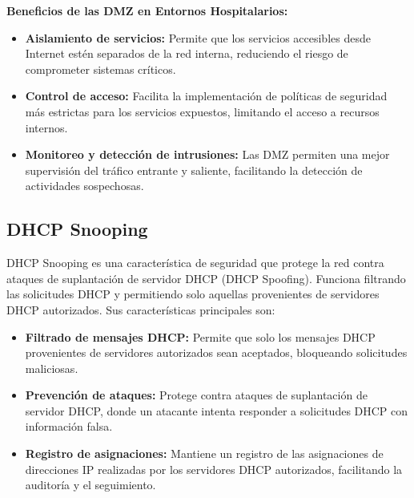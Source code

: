 \textbf{Beneficios de las DMZ en Entornos Hospitalarios:}
\begin{itemize}
    \item \textbf{Aislamiento de servicios:} Permite que los servicios accesibles desde Internet estén separados de la red interna, reduciendo el riesgo de comprometer sistemas críticos.
    \item \textbf{Control de acceso:} Facilita la implementación de políticas de seguridad más estrictas para los servicios expuestos, limitando el acceso a recursos internos.
    \item \textbf{Monitoreo y detección de intrusiones:} Las DMZ permiten una mejor supervisión del tráfico entrante y saliente, facilitando la detección de actividades sospechosas.
\end{itemize}

\subsection{DHCP Snooping}
\label{subsec:dhcpsnooping}
DHCP Snooping es una característica de seguridad que protege la red contra ataques de suplantación de servidor DHCP (DHCP Spoofing). Funciona filtrando las solicitudes DHCP y
permitiendo solo aquellas provenientes de servidores DHCP autorizados. Sus características principales son:
\begin{itemize}
    \item \textbf{Filtrado de mensajes DHCP:} Permite que solo los mensajes DHCP provenientes de servidores autorizados sean aceptados, bloqueando solicitudes maliciosas.
    \item \textbf{Prevención de ataques:} Protege contra ataques de suplantación de servidor DHCP, donde un atacante intenta responder a solicitudes DHCP con información falsa.
    \item \textbf{Registro de asignaciones:} Mantiene un registro de las asignaciones de direcciones IP realizadas por los servidores DHCP autorizados, facilitando la auditoría y el seguimiento.
\end{itemize}

